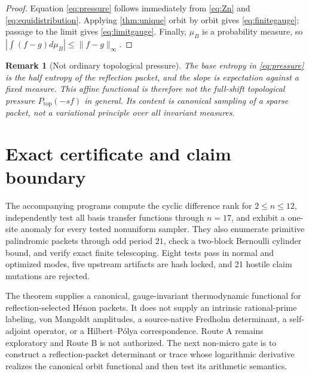 \documentclass[11pt]{article}
\newtheorem{remark}[theorem]{Remark}
\begin{document}
\begin{proof}
Equation \eqref{eq:pressure} follows immediately from \eqref{eq:Zn} and
\eqref{eq:equidistribution}.  Applying \cref{thm:unique} orbit by orbit gives
\eqref{eq:finitegauge}; passage to the limit gives \eqref{eq:limitgauge}.
Finally, $\mu_B$ is a probability measure, so
$|\int(f-g)d\mu_B|\le\lVert f-g\rVert_\infty$.
\end{proof}

\begin{remark}[Not ordinary topological pressure]
The base entropy in \eqref{eq:pressure} is the half entropy of the reflection
packet, and the slope is expectation against a fixed measure.  This affine
functional is therefore not the full-shift topological pressure
$P_{\mathrm{top}}(-sf)$ in general.  Its content is canonical sampling of a
sparse packet, not a variational principle over all invariant measures.
\end{remark}

\section{Exact certificate and claim boundary}

The accompanying programs compute the cyclic difference rank for
$2\le n\le12$, independently test all basis transfer functions through
$n=17$, and exhibit a one-site anomaly for every tested nonuniform sampler.
They also enumerate primitive palindromic packets through odd period $21$,
check a two-block Bernoulli cylinder bound, and verify exact finite
telescoping.  Eight tests pass in normal and optimized modes, five upstream
artifacts are hash locked, and 21 hostile claim mutations are rejected.

The theorem supplies a canonical, gauge-invariant thermodynamic functional
for reflection-selected H\'enon packets.  It does not supply an intrinsic
rational-prime labeling, von Mangoldt amplitudes, a source-native Fredholm
determinant, a self-adjoint operator, or a Hilbert--P\'olya correspondence.
Route A remains exploratory and Route B is not authorized.  The next
non-micro gate is to construct a reflection-packet determinant or trace whose
logarithmic derivative realizes the canonical orbit functional and then test
its arithmetic semantics.



\end{document}
